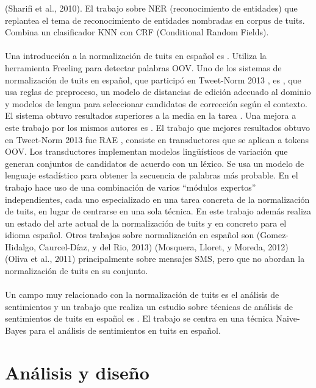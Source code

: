 \documentclass[14pt]{extarticle}
\theoremstyle{definition}
\theoremstyle{remark}
\begin{document}
(Sharifi et al., 2010). El trabajo \citep{liu:2011} sobre NER (reconocimiento de entidades) que replantea el tema de reconocimiento de entidades nombradas en corpus de tuits. Combina un clasificador KNN con CRF (Conditional Random Fields).
\\\\Una introducción a la normalización de tuits en español es \citep{alegria:2013}\citep{alegria:2015}. Utiliza la herramienta Freeling \citep{freeling} para detectar palabras OOV. Uno de los sistemas de normalización de tuits en español, que participó en Tweet-Norm 2013 \citep{alegria:2013}, es \citep{ruizcuadros:2013}\citep{vicomtech}, que usa reglas de preproceso, un modelo de distancias de edición adecuado al dominio y modelos de lengua para seleccionar candidatos de corrección según el contexto. El sistema obtuvo resultados superiores a la media en la tarea \citep{alegria:2013}\citep{tweetnorm}. Una mejora a este trabajo por los mismos autores es \citep{ruizcuadros:2014}. El trabajo que mejores resultados obtuvo en Tweet-Norm 2013 fue RAE \citep{porta:2013}, consiste en transductores que se aplican a tokens OOV. Los transductores implementan modelos lingüísticos de variación que generan conjuntos de candidatos de acuerdo con un léxico. Se usa un modelo de lenguaje estadístico para obtener la secuencia de palabras más probable. En el trabajo \citep{cotelocruz:2015} hace uso de una combinación de varios “módulos expertos” independientes, cada uno especializado en una tarea concreta de la normalización de tuits, en lugar de centrarse en una sola técnica. En este trabajo además realiza un estado del arte actual de la normalización de tuits y en concreto para el idioma español. Otros trabajos sobre normalización en español son (Gomez-Hidalgo, Caurcel-Díaz, y del Rio, 2013) (Mosquera, Lloret, y Moreda, 2012) (Oliva et al., 2011) principalmente sobre mensajes SMS, pero que no abordan la normalización de tuits en su conjunto.
\\\\
Un campo muy relacionado con la normalización de tuits es el análisis de sentimientos y un trabajo que realiza un estudio sobre técnicas de análisis de sentimientos de tuits en español es \citep{fernandezanta:2013}. El trabajo \citep{gamallo:2013} se centra en una técnica Naive-Bayes para el análisis de sentimientos en tuits en español.


\section{Análisis y diseño}\label{sec:analisisydiseno}
\end{document}
